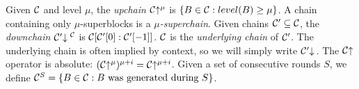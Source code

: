 Given $\mathcal{C}$ and level $\mu$, the \textit{upchain}
$\mathcal{C}\negthickspace\uparrow^\mu$ is $\{B \in \mathcal{C}: level(B) \geq \mu\}$. A chain
containing only $\mu$-superblocks is a $\mu$\textit{-superchain}. Given chains
$\mathcal{C}' \subseteq \mathcal{C}$, the \textit{downchain}
$\mathcal{C}'\negthickspace\downarrow\,\!^{\mathcal{C}}$ is $\mathcal{C}[\mathcal{C}'[0]:\mathcal{C}'[-1]]$. $\mathcal{C}$ is the
\textit{underlying chain} of $\mathcal{C}'$. The underlying chain is often implied by
context, so we will simply write $\mathcal{C}'\negthickspace\downarrow\,$. The $\mathcal{C}\negthickspace\uparrow$
operator is absolute: $(\mathcal{C}\negthickspace\uparrow^\mu)^{\mu + i} = \mathcal{C}\negthickspace\uparrow^{\mu +
i}$. Given a set of consecutive rounds $S$, we define $\mathcal{C}^S = \{B \in
\mathcal{C}: B \text{ was generated during } S\}$.
